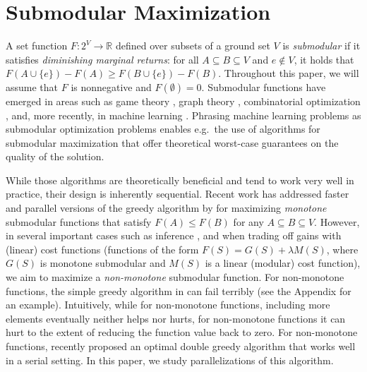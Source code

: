 \documentclass{article} %
\newcommand{\union}{\cup}
\begin{document}
\section{Submodular Maximization \label{sec:submodularmax}}
A set function $F: 2^V \to \mathbb{R}$ defined over subsets of a ground set $V$ is \emph{submodular} if it satisfies \emph{diminishing marginal returns}: for all $A \subseteq B \subseteq V$ and  $e \notin V$, it holds that $F(A \union \{e\}) - F(A) \geq F(B \union \{e\}) - F(B)$. Throughout this paper, we will assume that $F$ is nonnegative and $F(\emptyset)=0$. Submodular functions have emerged in areas such as game theory \cite{shapley71}, graph theory \cite{frank93}, combinatorial optimization \cite{schrijver02}, %
and, more recently, in machine learning \cite{tutorial,tutorial2}. Phrasing machine learning problems as submodular optimization problems enables e.g.\ the use of algorithms for submodular maximization \cite{buchbinder2012,nemhauser1978} that offer theoretical worst-case guarantees on the quality of the solution.

While those algorithms are theoretically beneficial and tend to work very well in practice, their design is inherently sequential. 
%
Recent work has addressed faster \cite{badan14,wei14} and parallel \cite{Mirzasoleiman2013,kumar13} versions of the greedy algorithm by \citet{nemhauser1978} for maximizing \emph{monotone} submodular functions that satisfy $F(A) \leq F(B)$ for any $A \subseteq B \subseteq V$. However, in several important cases such as inference \cite{Gillenwater12,reed13}, and when trading off gains with (linear) cost functions (functions of the form $F(S) = G(S) + \lambda M(S)$, where $G(S)$ is monotone submodular and $M(S)$ is a linear (modular) cost function), we aim to maximize a \emph{non-monotone} submodular function. For non-monotone functions, the simple greedy algorithm in \cite{nemhauser1978} can fail terribly (see the Appendix for an example). Intuitively, while for non-monotone functions, including more elements eventually neither helps nor hurts, for non-monotone functions it can hurt to the extent of reducing the function value back to zero.
For non-monotone functions, \citet{buchbinder2012} recently proposed an optimal double greedy algorithm that works well in a serial setting. In this paper, we study parallelizations of this algorithm.
\end{document}
